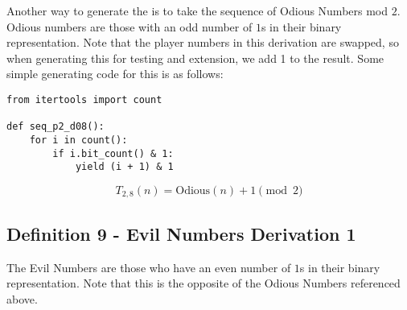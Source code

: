 \documentclass[conference]{IEEEtran}
\begin{document}

Another way to generate the \TMS is to take the sequence of Odious Numbers \cite{OEIS-Odious} mod $2$. Odious numbers are those with an odd number of $1$s in their binary representation. Note that the player numbers in this derivation are swapped, so when generating this for testing and extension, we add 1 to the result. Some simple generating code \cite{repo} for this is as follows:

\noindent\begin{minipage}[H]{0.48\textwidth}\begin{lstlisting}[style=pythonstyle]
from itertools import count

def seq_p2_d08():
    for i in count():
        if i.bit_count() & 1:
            yield (i + 1) & 1
\end{lstlisting}\end{minipage}

\begin{equation}
\label{eq:p2d08}
T_{2,8}(n) = \text{Odious}(n) + 1 \pmod{2}
\end{equation}




\subsection{Definition 9 - Evil Numbers Derivation 1}


The Evil Numbers \cite{OEIS-Evil} are those who have an even number of $1$s in their binary representation. Note that this is the opposite of the Odious Numbers referenced above.
\end{document}
